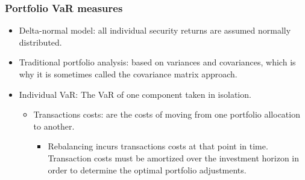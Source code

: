 \subsubsection{Portfolio VaR measures}
\begin{itemize}
\item Delta-normal model: all individual security returns are assumed normally distributed.
\item Traditional portfolio analysis: based on variances and covariances, which is why it is sometimes called the covariance matrix approach.
\item Individual VaR: The VaR of one component taken in isolation.

\begin{itemize}
    \item Transactions costs: are the costs of moving from one portfolio allocation to another.
        \begin{itemize}
        \item Rebalancing incurs transactions costs at that point in time. Transaction costs must be amortized over the investment horizon in order to determine the optimal portfolio adjustments.
        \end{itemize}
        

\end{itemize}
\end{itemize}
